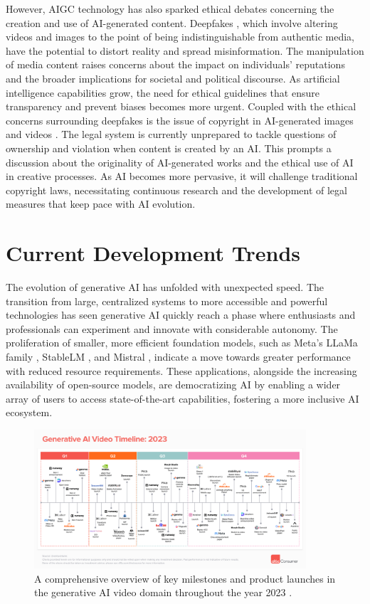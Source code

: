 \documentclass[11pt,a4paper,oneside]{report}
\begin{document}
However, AIGC technology has also sparked ethical debates concerning the creation and use of AI-generated content. 
Deepfakes \cite{westerlund2019emergence}, which involve altering videos and images to the point of being indistinguishable from authentic media, have the potential to distort reality and spread misinformation. 
The manipulation of media content raises concerns about the impact on individuals' reputations and the broader implications for societal and political discourse. 
As artificial intelligence capabilities grow, the need for ethical guidelines that ensure transparency and prevent biases becomes more urgent.
Coupled with the ethical concerns surrounding deepfakes is the issue of copyright in AI-generated images and videos \cite{hristov2016artificial}.
The legal system is currently unprepared to tackle questions of ownership and violation when content is created by an AI. 
This prompts a discussion about the originality of AI-generated works and the ethical use of AI in creative processes. 
As AI becomes more pervasive, it will challenge traditional copyright laws, necessitating continuous research and the development of legal measures that keep pace with AI evolution.


\section{Current Development Trends}

The evolution of generative AI has unfolded with unexpected speed.
The transition from large, centralized systems to more accessible and powerful technologies has seen generative AI quickly reach a phase where enthusiasts and professionals can experiment and innovate with considerable autonomy. 
The proliferation of smaller, more efficient foundation models, such as Meta's LLaMa family \cite{touvron2023llama}, StableLM \cite{StabilityAI_StableLM}, and Mistral \cite{jiang2023mistral}, indicate a move towards greater performance with reduced resource requirements. 
These applications, alongside the increasing availability of open-source models, are democratizing AI by enabling a wider array of users to access state-of-the-art capabilities, fostering a more inclusive AI ecosystem.

\begin{figure}[htbp]
  \centering
  \includegraphics[width=0.9\textwidth]{timeline.png}
  \caption{A comprehensive overview of key milestones and product launches in the generative AI video domain throughout the year 2023 \cite{a16zAI2023}.}
\end{figure}
\end{document}

